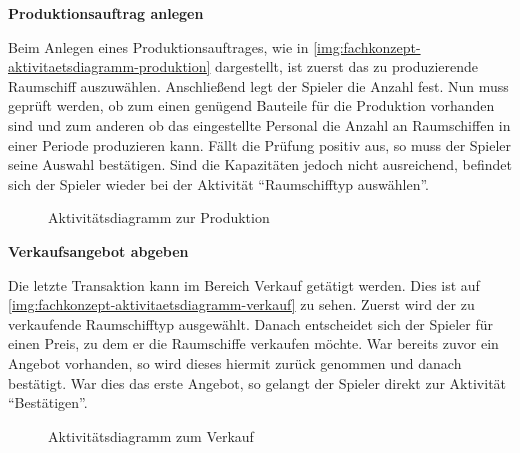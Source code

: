 \medskip

\textbf{Produktionsauftrag anlegen}

Beim Anlegen eines Produktionsauftrages, wie in \vref{img:fachkonzept-aktivitaetsdiagramm-produktion} dargestellt, ist zuerst das zu produzierende Raumschiff auszuwählen. Anschließend legt der Spieler die Anzahl fest. Nun muss geprüft werden, ob zum einen genügend Bauteile für die Produktion vorhanden sind und zum anderen ob das eingestellte Personal die Anzahl an Raumschiffen in einer Periode produzieren kann. Fällt die Prüfung positiv aus, so muss der Spieler seine Auswahl bestätigen. Sind die Kapazitäten jedoch nicht ausreichend, befindet sich der Spieler wieder bei der Aktivität “Raumschifftyp auswählen”.

\begin{figure}[h]
  \centering
  \caption{Aktivitätsdiagramm zur Produktion}
  \label{img:fachkonzept-aktivitaetsdiagramm-produktion}
\end{figure}

\medskip

\textbf{Verkaufsangebot abgeben}

Die letzte Transaktion kann im Bereich Verkauf getätigt werden. Dies ist auf \vref{img:fachkonzept-aktivitaetsdiagramm-verkauf} zu sehen. Zuerst wird der zu verkaufende Raumschifftyp ausgewählt. Danach entscheidet sich der Spieler für einen Preis, zu dem er die Raumschiffe verkaufen möchte. War bereits zuvor ein Angebot vorhanden, so wird dieses hiermit zurück genommen und danach bestätigt. War dies das erste Angebot, so gelangt der Spieler direkt zur Aktivität “Bestätigen”.

\begin{figure}[h]
  \centering
  \caption{Aktivitätsdiagramm zum Verkauf}
  \label{img:fachkonzept-aktivitaetsdiagramm-verkauf}
\end{figure}

\autorende{}